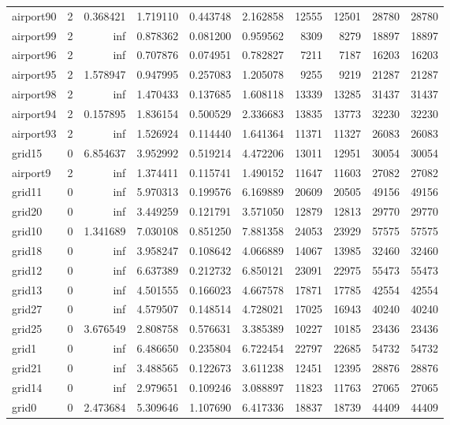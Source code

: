 \begin{longtable}{|l|r|r|r|r|r|r|r|r|r|}
airport90 & 2 & 0.368421 & 1.719110 & 0.443748 & 2.162858 & 12555 & 12501 & 28780 & 28780 \\
airport99 & 2 & inf & 0.878362 & 0.081200 & 0.959562 & 8309 & 8279 & 18897 & 18897 \\
airport96 & 2 & inf & 0.707876 & 0.074951 & 0.782827 & 7211 & 7187 & 16203 & 16203 \\
airport95 & 2 & 1.578947 & 0.947995 & 0.257083 & 1.205078 & 9255 & 9219 & 21287 & 21287 \\
airport98 & 2 & inf & 1.470433 & 0.137685 & 1.608118 & 13339 & 13285 & 31437 & 31437 \\
airport94 & 2 & 0.157895 & 1.836154 & 0.500529 & 2.336683 & 13835 & 13773 & 32230 & 32230 \\
airport93 & 2 & inf & 1.526924 & 0.114440 & 1.641364 & 11371 & 11327 & 26083 & 26083 \\
grid15 & 0 & 6.854637 & 3.952992 & 0.519214 & 4.472206 & 13011 & 12951 & 30054 & 30054 \\
airport9 & 2 & inf & 1.374411 & 0.115741 & 1.490152 & 11647 & 11603 & 27082 & 27082 \\
grid11 & 0 & inf & 5.970313 & 0.199576 & 6.169889 & 20609 & 20505 & 49156 & 49156 \\
grid20 & 0 & inf & 3.449259 & 0.121791 & 3.571050 & 12879 & 12813 & 29770 & 29770 \\
grid10 & 0 & 1.341689 & 7.030108 & 0.851250 & 7.881358 & 24053 & 23929 & 57575 & 57575 \\
grid18 & 0 & inf & 3.958247 & 0.108642 & 4.066889 & 14067 & 13985 & 32460 & 32460 \\
grid12 & 0 & inf & 6.637389 & 0.212732 & 6.850121 & 23091 & 22975 & 55473 & 55473 \\
grid13 & 0 & inf & 4.501555 & 0.166023 & 4.667578 & 17871 & 17785 & 42554 & 42554 \\
grid27 & 0 & inf & 4.579507 & 0.148514 & 4.728021 & 17025 & 16943 & 40240 & 40240 \\
grid25 & 0 & 3.676549 & 2.808758 & 0.576631 & 3.385389 & 10227 & 10185 & 23436 & 23436 \\
grid1 & 0 & inf & 6.486650 & 0.235804 & 6.722454 & 22797 & 22685 & 54732 & 54732 \\
grid21 & 0 & inf & 3.488565 & 0.122673 & 3.611238 & 12451 & 12395 & 28876 & 28876 \\
grid14 & 0 & inf & 2.979651 & 0.109246 & 3.088897 & 11823 & 11763 & 27065 & 27065 \\
grid0 & 0 & 2.473684 & 5.309646 & 1.107690 & 6.417336 & 18837 & 18739 & 44409 & 44409 \\

\end{longtable}
